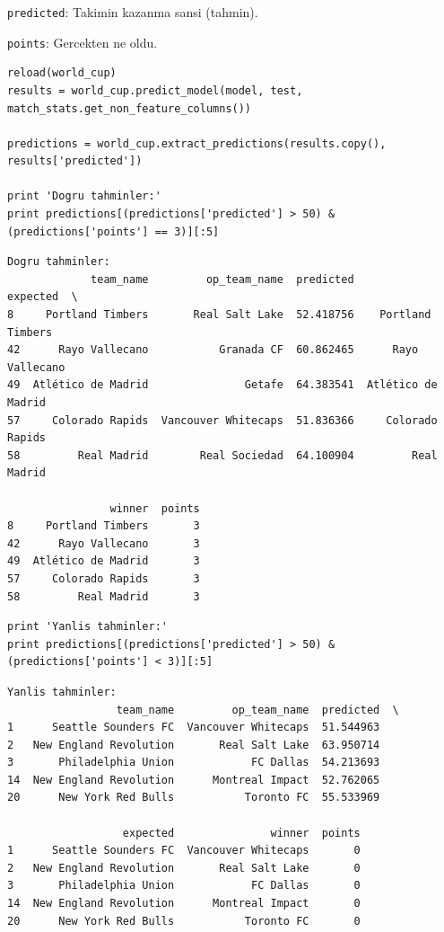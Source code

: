 \documentclass[12pt,fleqn]{article}\usepackage{../common}
\begin{document}
\verb!predicted!: Takimin kazanma sansi (tahmin).

\verb!points!: Gercekten ne oldu.

\begin{verbatim}
reload(world_cup)
results = world_cup.predict_model(model, test, match_stats.get_non_feature_columns())

predictions = world_cup.extract_predictions(results.copy(), results['predicted'])

print 'Dogru tahminler:'
print predictions[(predictions['predicted'] > 50) & (predictions['points'] == 3)][:5]
\end{verbatim}

\begin{verbatim}
Dogru tahminler:
             team_name         op_team_name  predicted            expected  \
8     Portland Timbers       Real Salt Lake  52.418756    Portland Timbers   
42      Rayo Vallecano           Granada CF  60.862465      Rayo Vallecano   
49  Atlético de Madrid               Getafe  64.383541  Atlético de Madrid   
57     Colorado Rapids  Vancouver Whitecaps  51.836366     Colorado Rapids   
58         Real Madrid        Real Sociedad  64.100904         Real Madrid   

                winner  points  
8     Portland Timbers       3  
42      Rayo Vallecano       3  
49  Atlético de Madrid       3  
57     Colorado Rapids       3  
58         Real Madrid       3  
\end{verbatim}

\begin{verbatim}
print 'Yanlis tahminler:'
print predictions[(predictions['predicted'] > 50) & (predictions['points'] < 3)][:5]
\end{verbatim}

\begin{verbatim}
Yanlis tahminler:
                 team_name         op_team_name  predicted  \
1      Seattle Sounders FC  Vancouver Whitecaps  51.544963   
2   New England Revolution       Real Salt Lake  63.950714   
3       Philadelphia Union            FC Dallas  54.213693   
14  New England Revolution      Montreal Impact  52.762065   
20      New York Red Bulls           Toronto FC  55.533969   

                  expected               winner  points  
1      Seattle Sounders FC  Vancouver Whitecaps       0  
2   New England Revolution       Real Salt Lake       0  
3       Philadelphia Union            FC Dallas       0  
14  New England Revolution      Montreal Impact       0  
20      New York Red Bulls           Toronto FC       0  
\end{verbatim}
\end{document}
